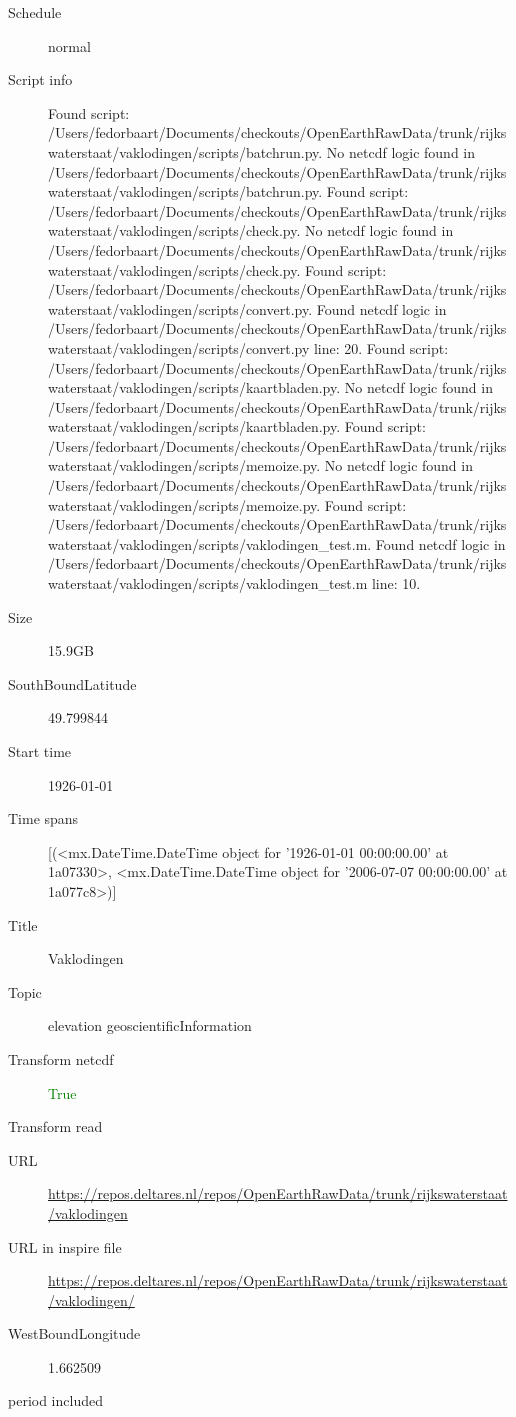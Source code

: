\documentclass[9]{report}
\begin{document}
\begin{description}
\begin{verbatim}
\end{verbatim}
  \item[Schedule] normal
  \item[Script info] Found script: /Users/fedorbaart/Documents/checkouts/OpenEarthRawData/trunk/rijkswaterstaat/vaklodingen/scripts/batchrun.py.
No netcdf logic found in /Users/fedorbaart/Documents/checkouts/OpenEarthRawData/trunk/rijkswaterstaat/vaklodingen/scripts/batchrun.py.
Found script: /Users/fedorbaart/Documents/checkouts/OpenEarthRawData/trunk/rijkswaterstaat/vaklodingen/scripts/check.py.
No netcdf logic found in /Users/fedorbaart/Documents/checkouts/OpenEarthRawData/trunk/rijkswaterstaat/vaklodingen/scripts/check.py.
Found script: /Users/fedorbaart/Documents/checkouts/OpenEarthRawData/trunk/rijkswaterstaat/vaklodingen/scripts/convert.py.
Found netcdf logic in /Users/fedorbaart/Documents/checkouts/OpenEarthRawData/trunk/rijkswaterstaat/vaklodingen/scripts/convert.py line: 20.
Found script: /Users/fedorbaart/Documents/checkouts/OpenEarthRawData/trunk/rijkswaterstaat/vaklodingen/scripts/kaartbladen.py.
No netcdf logic found in /Users/fedorbaart/Documents/checkouts/OpenEarthRawData/trunk/rijkswaterstaat/vaklodingen/scripts/kaartbladen.py.
Found script: /Users/fedorbaart/Documents/checkouts/OpenEarthRawData/trunk/rijkswaterstaat/vaklodingen/scripts/memoize.py.
No netcdf logic found in /Users/fedorbaart/Documents/checkouts/OpenEarthRawData/trunk/rijkswaterstaat/vaklodingen/scripts/memoize.py.
Found script: /Users/fedorbaart/Documents/checkouts/OpenEarthRawData/trunk/rijkswaterstaat/vaklodingen/scripts/vaklodingen\_test.m.
Found netcdf logic in /Users/fedorbaart/Documents/checkouts/OpenEarthRawData/trunk/rijkswaterstaat/vaklodingen/scripts/vaklodingen\_test.m line: 10.
  \item[Size] 15.9GB
  \item[SouthBoundLatitude] 49.799844
  \item[Start time] 1926-01-01
  \item[Time spans] [(<mx.DateTime.DateTime object for '1926-01-01 00:00:00.00' at 1a07330>, <mx.DateTime.DateTime object for '2006-07-07 00:00:00.00' at 1a077c8>)]
  \item[Title]  Vaklodingen 
  \item[Topic] elevation geoscientificInformation
  \item[Transform netcdf] \textcolor{green}{True}
  \item[Transform read] \textcolor{blue}{}
  \item[URL] \href{https://repos.deltares.nl/repos/OpenEarthRawData/trunk/rijkswaterstaat/vaklodingen}{https://repos.deltares.nl/repos/OpenEarthRawData/trunk/rijkswaterstaat/vaklodingen}
  \item[URL in inspire file] \href{https://repos.deltares.nl/repos/OpenEarthRawData/trunk/rijkswaterstaat/vaklodingen/}{https://repos.deltares.nl/repos/OpenEarthRawData/trunk/rijkswaterstaat/vaklodingen/}
  \item[WestBoundLongitude] 1.662509
  \item[period included] 
\end{description}
\end{document}
